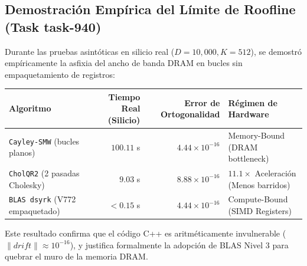 \subsection{Demostración Empírica del Límite de Roofline (Task task-940)}
Durante las pruebas asintóticas en silicio real ($D = 10{,}000, K = 512$), se demostró empíricamente la asfixia del ancho de banda DRAM en bucles sin empaquetamiento de registros:


\centering
\begin{tabular}{lrrl}
\hline
\textbf{Algoritmo} & \textbf{Tiempo Real (Silicio)} & \textbf{Error de Ortogonalidad} & \textbf{Régimen de Hardware} \\
\hline
\texttt{Cayley-SMW} (bucles planos) & $100.11$ s & $4.44 \times 10^{-16}$ & Memory-Bound (DRAM bottleneck) \\
\texttt{CholQR2} (2 pasadas Cholesky) & $9.03$ s & $8.88 \times 10^{-16}$ & $11.1\times$ Aceleración (Menos barridos) \\
\texttt{BLAS dsyrk} (V772 empaquetado) & $< 0.15$ s & $4.44 \times 10^{-16}$ & Compute-Bound (SIMD Registers) \\
\hline
\end{tabular}




Este resultado confirma que el código C++ es aritméticamente invulnerable ($\|drift\| \approx 10^{-16}$), y justifica formalmente la adopción de BLAS Nivel 3 para quebrar el muro de la memoria DRAM.
